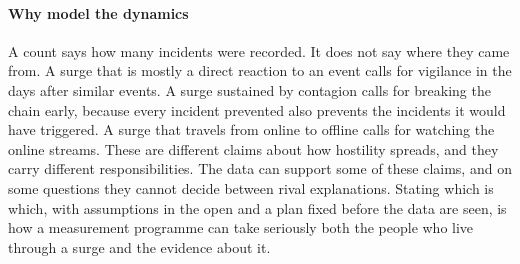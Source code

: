 \paragraph{Why model the dynamics}
A count says how many incidents were recorded. It does not say where they
came from. A surge that is mostly a direct reaction to an event calls for
vigilance in the days after similar events. A surge sustained by contagion
calls for breaking the chain early, because every incident prevented also
prevents the incidents it would have triggered. A surge that travels from
online to offline calls for watching the online streams. These are different
claims about how hostility spreads, and they carry different
responsibilities. The data can support some of these claims, and on some
questions they cannot decide between rival explanations. Stating which is
which, with assumptions in the open and a plan fixed before the data are
seen, is how a measurement programme can take seriously both the people who
live through a surge and the evidence about it.

